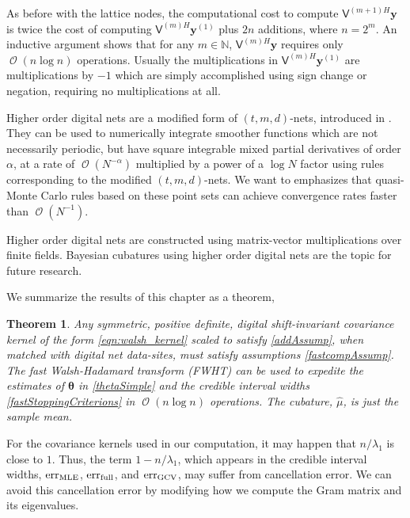 \documentclass{iitthesis}          %
\DeclareMathOperator{\Order}{{\mathcal O}}
\newcommand{\bm}[1]{\boldsymbol{#1}}
\newcommand{\naturals}{\mathbb{N}}
\newcommand{\vtheta}{{\bm{\theta}}}
\newcommand{\vy}{\bm{y}}
\newcommand{\mV}{\mathsf{V}}
\newcommand{\hmu}{\widehat{\mu}}
\newcommand{\MLE}{\textup{MLE}}
\newcommand{\err}{\textup{err}}
\newtheorem{theorem}{Theorem}[section]
\begin{document}
As before with the lattice nodes, the computational cost to compute $\mV^{(m+1)H} \vy$ is 
twice the cost of computing $\mV^{(m)H} \vy^{(1)}$ plus $2n$ additions, where $n=2^m$. An inductive argument shows that for any $m \in \naturals$, $\mV^{(m)H}\vy$ requires only $\Order(n \log n)$ operations. Usually the multiplications in $\mV^{(m)H} \vy^{(1)}$ are multiplications by $-1$ which are simply accomplished using sign change or negation, requiring no multiplications at all.


Higher order digital nets are a modified form of $(t,m,d)$-nets, introduced in \cite{Dic08a}. They can be used to numerically integrate smoother functions which are not necessarily periodic, but have square integrable mixed partial derivatives of order $\alpha$, at a rate of $\Order(N^{-\alpha})$ multiplied by a power of a $\log N$ factor using rules corresponding to the modified $(t,m, d)$-nets.
We want to emphasizes that quasi-Monte Carlo rules based on these point sets can achieve convergence rates faster than $\Order(N^{-1})$.

Higher order digital nets are constructed using matrix-vector multiplications over finite
fields. Bayesian cubatures using higher order digital nets are the topic for future research.



We summarize the results of this chapter as a theorem,
\begin{theorem}
	Any symmetric, positive definite, digital shift-invariant covariance kernel of the form \eqref{eqn:walsh_kernel} scaled to satisfy \eqref{addAssump}, when matched with digital net data-sites, must satisfy assumptions \eqref{fastcompAssump}.  The \emph{fast Walsh-Hadamard transform} (FWHT) can be used to expedite the estimates of $\vtheta$ in \eqref{thetaSimple} and the credible interval widths \eqref{fastStoppingCriterions} in $\Order(n \log n)$ operations. The cubature, $\hmu$, is just the sample mean.
\end{theorem}



\clearpage







\label{sec:NumImpl}

\label{sec:overcome_cancel_error}

For the covariance kernels used in our computation, it may happen that $n/\lambda_1$ is close to $1$.  Thus, the term $1-n/\lambda_1$, which appears in the credible interval widths, $\err_{\MLE}$, $\err_{\textup{full}}$, and $\err_{\textup{GCV}}$, may suffer from cancellation error.  We can avoid this cancellation error by modifying how we compute the Gram matrix and its eigenvalues.
\end{document}
